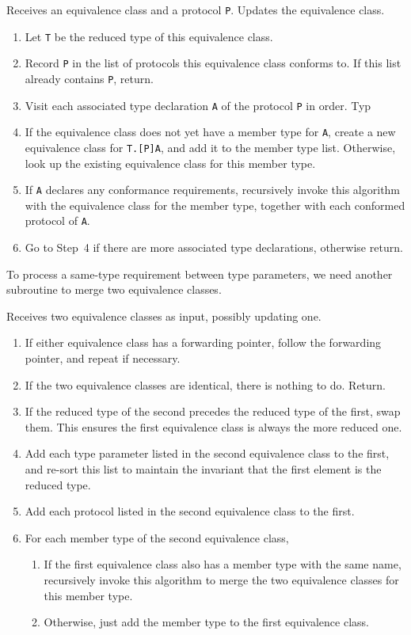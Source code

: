 \documentclass[../generics]{subfiles}
\begin{document}
\begin{algorithm}\label{archetype builder expand}
Receives an equivalence class and a protocol \texttt{P}. Updates the equivalence class.
\begin{enumerate}
\item Let \texttt{T} be the reduced type of this equivalence class.
\item Record \texttt{P} in the list of protocols this equivalence class conforms to. If this list already contains \texttt{P}, return.
\item Visit each associated type declaration \texttt{A} of the protocol \texttt{P} in order.
Typ\item If the equivalence class does not yet have a member type for \texttt{A}, create a new equivalence class for \texttt{T.[P]A}, and add it to the member type list. Otherwise, look up the existing equivalence class for this member type.
\item If \texttt{A} declares any conformance requirements, recursively invoke this algorithm with the equivalence class for the member type, together with each conformed protocol of \texttt{A}.
\item Go to Step~4 if there are more associated type declarations, otherwise return.
\end{enumerate}
\end{algorithm}
To process a same-type requirement between type parameters, we need another subroutine to merge two equivalence classes.
\begin{algorithm}\label{archetype builder merge}
Receives two equivalence classes as input, possibly updating one.
\begin{enumerate}
\item If either equivalence class has a forwarding pointer, follow the forwarding pointer, and repeat if necessary.
\item If the two equivalence classes are identical, there is nothing to do. Return.
\item If the reduced type of the second precedes the reduced type of the first, swap them. This ensures the first equivalence class is always the more reduced one.
\item Add each type parameter listed in the second equivalence class to the first, and re-sort this list to maintain the invariant that the first element is the reduced type.
\item Add each protocol listed in the second equivalence class to the first.
\item For each member type of the second equivalence class,
\begin{enumerate}
\item If the first equivalence class also has a member type with the same name, recursively invoke this algorithm to merge the two equivalence classes for this member type.
\item Otherwise, just add the member type to the first equivalence class.
\end{enumerate}
\end{enumerate}
\end{algorithm}
\end{document}
